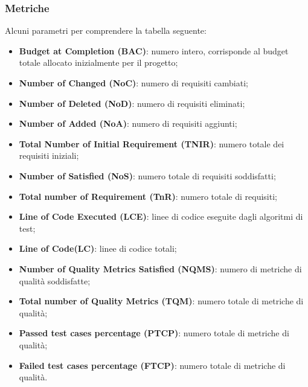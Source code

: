 \subsubsection{Metriche}
Alcuni parametri per comprendere la tabella seguente:
\begin{itemize}
	\item \textbf{Budget at Completion (BAC)}: numero intero, corrisponde al budget totale allocato inizialmente per il progetto;
	
	\item \textbf{Number of Changed (NoC)}: numero di requisiti cambiati;
	
	\item \textbf{Number of Deleted (NoD)}: numero di requisiti eliminati;
	
	\item \textbf{Number of Added (NoA)}: numero di requisiti aggiunti;
	
	\item \textbf{Total Number of Initial Requirement (TNIR)}: numero totale dei requisiti iniziali;
	
	\item \textbf{Number of Satisfied (NoS)}: numero totale di requisiti soddisfatti;
	
	\item \textbf{Total number of Requirement (TnR)}: numero totale di requisiti;
	
	\item \textbf{Line of Code Executed (LCE)}: linee di codice eseguite dagli algoritmi di test;
	
	\item \textbf{Line of Code(LC)}: linee di codice totali;
	
	\item \textbf{Number of Quality Metrics Satisfied (NQMS)}: numero di metriche di qualità soddisfatte;
	
	\item \textbf{Total number of Quality Metrics (TQM)}: numero totale di metriche di qualità;
	
	\item \textbf{Passed test cases percentage (PTCP)}: numero totale di metriche di qualità;
	
	\item \textbf{Failed test cases percentage (FTCP)}: numero totale di metriche di qualità.
	
\end{itemize}


